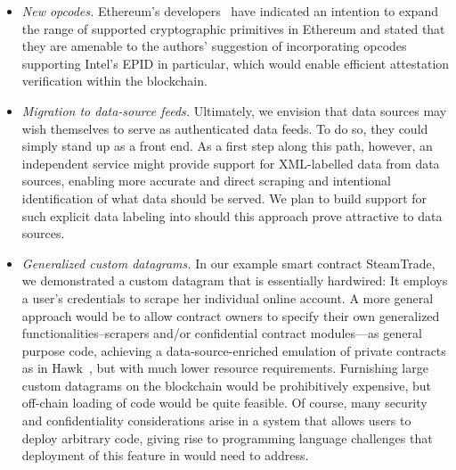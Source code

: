 \begin{itemize}
\item{\em New opcodes.} Ethereum's developers~\cite{Buterinpersonal} have indicated an intention to expand the range of supported cryptographic primitives in Ethereum and stated that they are amenable to the authors' suggestion of incorporating opcodes supporting Intel's EPID in particular, which would enable efficient attestation verification within the blockchain. 
\item{\em Migration to data-source feeds.} Ultimately, we envision that data sources may wish themselves to serve as authenticated data feeds. To do so, they could simply stand up \tc as a front end. As a first step along this path, however, an independent \tc service might provide support for XML-labelled data from data sources, enabling more accurate and direct scraping and intentional identification of what data should be served. We plan to build support for such explicit data labeling into \tc should this approach prove attractive to data sources.
\item{\em Generalized custom datagrams.} In our example smart contract {\sf SteamTrade}, we demonstrated a custom datagram that is essentially hardwired: It employs a user's credentials to scrape her individual online account. A more general approach would be to allow contract owners to specify their own generalized functionalities--scrapers and/or confidential contract modules---as general purpose code, achieving a data-source-enriched emulation of private contracts as in Hawk~\cite{hawk}, but with much lower resource requirements. Furnishing large custom datagrams on the blockchain would be prohibitively expensive, but off-chain loading of code would be quite feasible. Of course, many security and confidentiality considerations arise in a system that allows users to deploy arbitrary code, giving rise to programming language challenges that deployment of this feature in \tc would need to address.
\end{itemize}


